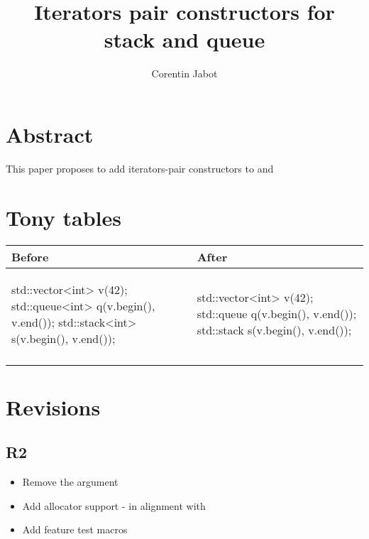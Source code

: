 \documentclass{wg21}
\title{Iterators pair constructors for stack and queue}
\author{Corentin Jabot}{corentin.jabot@gmail.com}
\begin{document}
\maketitle

\section{Abstract}

This paper proposes to add iterators-pair constructors to  and 

\section{Tony tables}
\begin{center}
\begin{tabular}{l|l}
Before & After\\ \hline

\begin{minipage}[t]{0.5\textwidth}
\begin{colorblock}
std::vector<int> v(42);
std::queue<int> q({v.begin(), v.end()});
std::stack<int> s({v.begin(), v.end()});
\end{colorblock}
\end{minipage}
&
\begin{minipage}[t]{0.3\textwidth}
\begin{colorblock}
std::vector<int> v(42);
std::queue q(v.begin(), v.end());
std::stack s(v.begin(), v.end());
\end{colorblock}
\end{minipage}
\\\\ \hline

\end{tabular}
\end{center}

\section{Revisions}

\subsection{R2}
\begin{itemize}
    \item Remove the  argument
    \item Add allocator support - in alignment with 
    \item Add feature test macros
\end{itemize}
\end{document}

